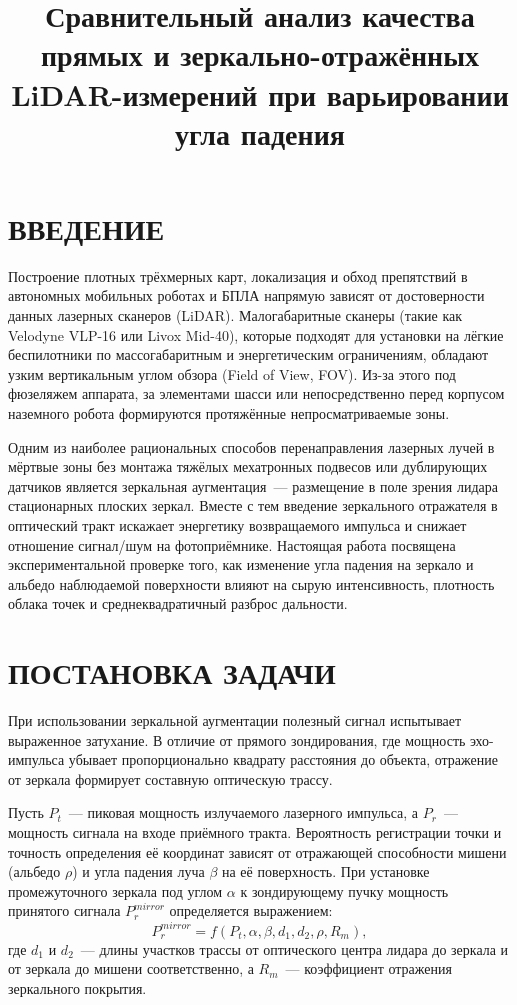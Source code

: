 \documentclass{misisarticle}
\title{Сравнительный анализ качества прямых и зеркально-отражённых LiDAR-измерений при варьировании угла падения}
\begin{document}
\maketitle

\section{ВВЕДЕНИЕ}

Построение плотных трёхмерных карт, локализация и обход препятствий в автономных мобильных роботах и БПЛА напрямую зависят от достоверности данных лазерных сканеров (LiDAR). Малогабаритные сканеры (такие как Velodyne VLP-16 или Livox Mid-40), которые подходят для установки на лёгкие беспилотники по массогабаритным и энергетическим ограничениям, обладают узким вертикальным углом обзора (Field of View, FOV). Из-за этого под фюзеляжем аппарата, за элементами шасси или непосредственно перед корпусом наземного робота формируются протяжённые непросматриваемые зоны.

Одним из наиболее рациональных способов перенаправления лазерных лучей в мёртвые зоны без монтажа тяжёлых мехатронных подвесов или дублирующих датчиков является зеркальная аугментация~--- размещение в поле зрения лидара стационарных плоских зеркал. Вместе с тем введение зеркального отражателя в оптический тракт искажает энергетику возвращаемого импульса и снижает отношение сигнал/шум на фотоприёмнике. Настоящая работа посвящена экспериментальной проверке того, как изменение угла падения на зеркало и альбедо наблюдаемой поверхности влияют на сырую интенсивность, плотность облака точек и среднеквадратичный разброс дальности.

\section{ПОСТАНОВКА ЗАДАЧИ}

При использовании зеркальной аугментации полезный сигнал испытывает выраженное затухание. В отличие от прямого зондирования, где мощность эхо-импульса убывает пропорционально квадрату расстояния до объекта, отражение от зеркала формирует составную оптическую трассу.

Пусть $P_t$~--- пиковая мощность излучаемого лазерного импульса, а $P_r$~--- мощность сигнала на входе приёмного тракта. Вероятность регистрации точки и точность определения её координат зависят от отражающей способности мишени (альбедо $\rho$) и угла падения луча $\beta$ на её поверхность. При установке промежуточного зеркала под углом $\alpha$ к зондирующему пучку мощность принятого сигнала $P_r^{mirror}$ определяется выражением:
\begin{equation}
    P_r^{mirror} = f(P_t, \alpha, \beta, d_1, d_2, \rho, R_m),
\end{equation}
где $d_1$ и $d_2$~--- длины участков трассы от оптического центра лидара до зеркала и от зеркала до мишени соответственно, а $R_m$~--- коэффициент отражения зеркального покрытия.
\end{document}
